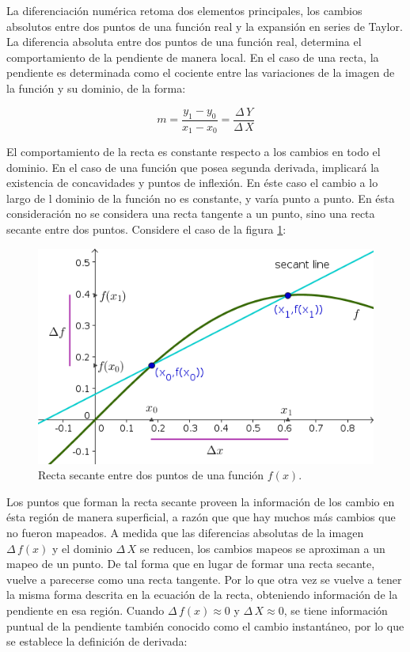 \documentclass[letterpaper,10pt,oneside]{sphinxmanual}
\theoremstyle{plain}%
\theoremstyle{definition}%
\theoremstyle{remark}%
\begin{document}
La diferenciación numérica retoma dos elementos principales, los cambios absolutos entre dos puntos de una función real y la expansión en series de Taylor. La diferencia absoluta entre dos puntos de una función real, determina el comportamiento de la pendiente de manera local.  En el caso de una recta, la pendiente es determinada como el cociente entre las variaciones de la imagen de la función y su dominio, de la forma:

\begin{equation}
m = \frac{y_{1} - y_{0}}{x_{1} - x_{0}} = \frac{\Delta\,Y}{\Delta\,X}
\end{equation}

El comportamiento de la recta es constante respecto a los cambios en todo el dominio. En el caso de una función que posea segunda derivada, implicará la existencia de concavidades y puntos de inflexión. En éste caso el cambio a lo largo de l dominio de la función no es constante, y varía punto a punto. En ésta consideración no se considera una recta tangente a un punto, sino una recta secante entre dos puntos. Considere el caso de la figura \ref{F1}:

\begin{figure}[h]
\centering
\includegraphics[scale=2]{Figures/F1.png}
\caption{Recta secante entre dos puntos de una función $f(x)$.}
\label{F1}
\end{figure}

Los puntos que forman la recta secante proveen la información de los cambio en ésta región de manera superficial, a razón que que hay muchos más cambios que no fueron mapeados. A medida que las diferencias absolutas de la imagen $\Delta\,f(x)$ y el dominio $\Delta\,X$ se reducen, los cambios mapeos se aproximan a un mapeo de un punto. De tal forma que en lugar de formar una recta secante, vuelve a parecerse como una recta tangente. Por lo que otra vez se vuelve a tener la misma forma descrita en la ecuación de la recta, obteniendo información de la pendiente en esa región. Cuando $\Delta\,f(x)\approx0$ y $\Delta\,X\approx0$, se tiene información puntual de la pendiente también conocido como el cambio instantáneo, por lo que se establece la definición de derivada:
\end{document}
